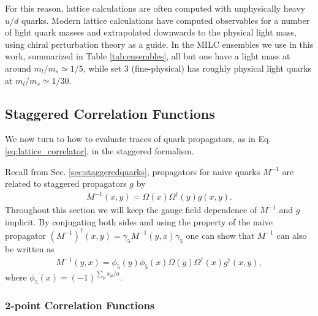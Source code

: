 For this reason, lattice calculations are often computed with unphysically heavy $u/d$ quarks. Modern lattice calculations have computed observables for a number of light quark masses and extrapolated downwards to the physical light mass, using chiral perturbation theory as a guide. In the MILC ensembles we use in this work, summarized in Table \ref{tab:ensembles}, all but one have a light mass at around $m_l/m_s \simeq 1/5$, while set 3 (fine-physical) has roughly physical light quarks at $m_l/m_s \simeq 1/30$.


\subsection{Staggered Correlation Functions}
\label{sec:staggeredcorrelators}

We now turn to how to evaluate traces of quark propagators, as in Eq. \eqref{eq:lattice_correlator}, in the staggered formalism. %

Recall from Sec. \ref{sec:staggeredquarks}, propagators for naive quarks $M^{-1}$ are related to staggered propagators $g$ by
\begin{align}
  M^{-1}(x,y) = \Omega(x)\Omega^{\dagger}(y) g(x,y).
\end{align}
Throughout this section we will keep the gauge field dependence of $M^{-1}$ and $g$ implicit. By conjugating both sides and using the property of the naive propagator $(M^{-1})^{\dagger}(x,y) = \gamma_5 M^{-1}(y,x)\gamma_5$ one can show that $M^{-1}$ can also be written as
\begin{align}
  \label{eq:Gconj}
  M^{-1}(y,x) = \phi_5(y)\phi_5(x) \Omega(y)\Omega^{\dagger}(x) g^{\dagger}(x,y),
\end{align}
where $\phi_5(x) = (-1)^{\sum_{\mu} x_{\mu}/a}$.

\subsubsection{2-point Correlation Functions}

